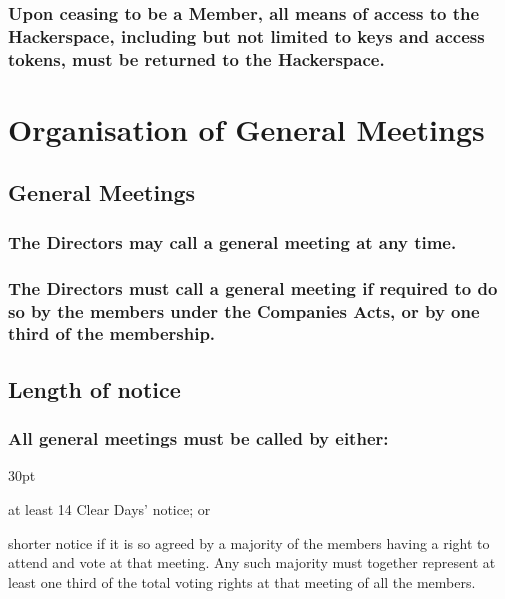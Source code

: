 \documentclass[12pt]{article}
\def\clauseindent{30pt}
\newenvironment{subindentpara}{\raggedright\begin{adjustwidth}{\clauseindent}{}\begin{hanginglist}}{\end{hanginglist}\end{adjustwidth}}
\begin{document}
\subsubsection[Return of Keys upon Membership Termination]{Upon ceasing to be a Member, all means of access to the Hackerspace, including but not limited to keys and access tokens, must be returned to the Hackerspace.}

\vspace{1.5\baselineskip}\section*{Organisation of General Meetings}

\subsection{General Meetings}
\subsubsection[Directors May Call a General Meeting]{The Directors may call a general meeting at any time.}
\subsubsection[Directors May be Compelled to Gall a General Meeting]{The Directors must call a general meeting if required to do so by the members under the Companies Acts, or by one third of the membership.}

\subsection[Length of Notice of General Meetings]{Length of notice}
\subsubsection[Specifics of Length of Notice of General Meetings]{All general meetings must be called by either:}
\begin{subindentpara}
    \item at least 14 Clear Days' notice; or
    \item shorter notice if it is so agreed by a majority of the members having a right to attend and vote at that meeting. Any such majority must together represent at least one third of the total voting rights at that meeting of all the members.
\end{subindentpara}
\end{document}
